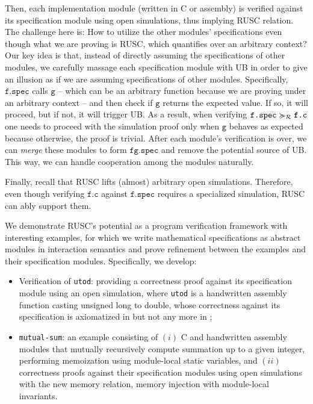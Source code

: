 Then, each implementation module (written in C or assembly) is verified against its specification module using open simulations, thus implying RUSC relation.
The challenge here is: How to utilize the other modules' specifications even though what we are proving is RUSC, which quantifies over an arbitrary context?
Our key idea is that, instead of directly assuming the specifications of other modules, we carefully massage each specification module with UB in order to give an illusion as if we are assuming specifications of other modules.
Specifically, $\texttt{f.spec}$ calls $\texttt{g}$ -- which can be an arbitrary function because we are proving under an arbitrary context -- and then check if $\texttt{g}$ returns the expected value. If so, it will proceed, but if not, it will trigger UB.
As a result, when verifying $\texttt{f.spec} \succcurlyeq_{\mathcal{R}} \texttt{f.c}$ one needs to proceed with the simulation proof only when $\texttt{g}$ behaves as expected because otherwise, the proof is trivial.
After each module's verification is over, we can {\it merge} these modules to form $\texttt{fg.spec}$ and remove the potential source of UB.
This way, we can handle cooperation among the modules naturally.

Finally, recall that RUSC lifts (almost) arbitrary open simulations.
Therefore, even though verifying $\texttt{f.c}$ against $\texttt{f.spec}$ requires a specialized simulation, RUSC can ably support them.


We demonstrate RUSC's potential as a program verification framework with interesting
examples, for which we write mathematical specifications as abstract
modules in interaction semantics and prove refinement between the
examples and their specification modules.  Specifically, we develop:
\begin{itemize}
\item Verification of \texttt{utod}: providing a correctness proof
  against its specification module using an open simulation,
  where \texttt{utod} is a handwritten
  assembly function casting unsigned long to double, whose correctness
  against its specification is axiomatized in \cc{} but not any more
  in \ccm{};
\item \texttt{mutual-sum}: an example consisting of $(i)$ C and
  handwritten assembly modules that mutually recursively compute
  summation up to a given integer, performing memoization using
  module-local static variables, and $(ii)$ correctness proofs
  against their specification modules using open simulations with the
  new memory relation, memory injection with module-local invariants.
\end{itemize}
\medskip

